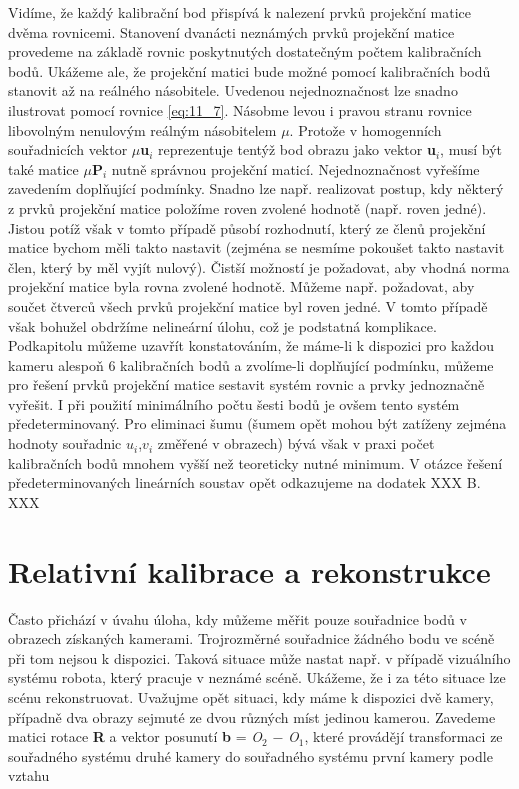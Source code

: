 Vidíme, že každý kalibrační bod přispívá k nalezení prvků projekční matice dvěma rovnicemi. Stanovení dvanácti neznámých prvků projekční matice provedeme na základě rovnic poskytnutých dostatečným počtem kalibračních bodů. Ukážeme ale, že projekční matici bude možné pomocí kalibračních bodů stanovit až na reálného násobitele. Uvedenou nejednoznačnost lze snadno ilustrovat pomocí rovnice \eqref{eq:11_7}. Násobme levou i pravou stranu rovnice libovolným nenulovým reálným násobitelem $\mu$. Protože v homogenních souřadnicích vektor $\mu$\textbf{u}$_{i}$ reprezentuje tentýž bod obrazu jako vektor \textbf{u}$_{i}$, musí být také matice $\mu$\textbf{P}$_{i}$ nutně správnou projekční maticí. Nejednoznačnost vyřešíme zavedením doplňující podmínky. Snadno lze např. realizovat postup, kdy některý z prvků projekční matice položíme roven zvolené hodnotě (např. roven jedné). Jistou potíž však v tomto případě působí rozhodnutí, který ze členů projekční matice bychom měli takto nastavit (zejména se nesmíme pokoušet takto nastavit člen, který by měl vyjít nulový). Čistší možností je požadovat, aby vhodná norma projekční matice byla rovna zvolené hodnotě. Můžeme např. požadovat, aby součet čtverců všech prvků projekční matice byl roven jedné. V tomto případě však bohužel obdržíme nelineární úlohu, což je podstatná komplikace. Podkapitolu můžeme uzavřít konstatováním, že máme-li k dispozici pro každou kameru alespoň 6 kalibračních bodů a zvolíme-li doplňující podmínku, můžeme pro řešení prvků projekční matice sestavit systém rovnic a prvky jednoznačně vyřešit. I při použití minimálního počtu šesti bodů je ovšem tento systém předeterminovaný. Pro eliminaci šumu (šumem opět mohou být zatíženy zejména hodnoty souřadnic $u_i$,$v_i$ změřené v obrazech) bývá však v praxi počet kalibračních bodů mnohem vyšší než teoreticky nutné minimum. V otázce řešení předeterminovaných lineárních soustav opět odkazujeme na dodatek XXX B. XXX

\section*{Relativní kalibrace a rekonstrukce}

Často přichází v úvahu úloha, kdy můžeme měřit pouze souřadnice bodů v obrazech získaných kamerami. Trojrozměrné souřadnice žádného bodu ve scéně při tom nejsou k dispozici. Taková situace může nastat např. v případě vizuálního systému robota, který pracuje v neznámé scéně. Ukážeme, že i za této situace lze scénu rekonstruovat. Uvažujme opět situaci, kdy máme k dispozici dvě kamery, případně dva obrazy sejmuté ze dvou různých míst jedinou kamerou. Zavedeme matici rotace \textbf{R} a vektor posunutí \textbf{b} = \textit{O}$_2$ $-$ \textit{O}$_1$, které provádějí transformaci ze souřadného systému druhé kamery do souřadného systému první kamery podle vztahu

